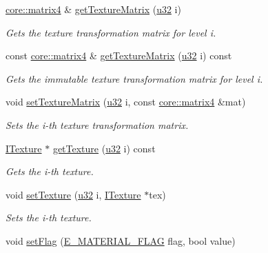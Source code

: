 \begin{DoxyCompactItemize}
\hyperlink{namespaceirr_1_1core_a4c9d4e29899535971052810954a14431}{core\+::matrix4} \& \hyperlink{classirr_1_1video_1_1SMaterial_a102aec38ea69a7c609edfad74b40463c}{get\+Texture\+Matrix} (\hyperlink{namespaceirr_a0416a53257075833e7002efd0a18e804}{u32} i)
\begin{DoxyCompactList}\small\item\em Gets the texture transformation matrix for level i. \end{DoxyCompactList}\item 
const \hyperlink{namespaceirr_1_1core_a4c9d4e29899535971052810954a14431}{core\+::matrix4} \& \hyperlink{classirr_1_1video_1_1SMaterial_a6b0adff4b14c80da0be8e8d600252fcd}{get\+Texture\+Matrix} (\hyperlink{namespaceirr_a0416a53257075833e7002efd0a18e804}{u32} i) const
\begin{DoxyCompactList}\small\item\em Gets the immutable texture transformation matrix for level i. \end{DoxyCompactList}\item 
void \hyperlink{classirr_1_1video_1_1SMaterial_a6e1a89f5005226a9cecb5272ef44ba7d}{set\+Texture\+Matrix} (\hyperlink{namespaceirr_a0416a53257075833e7002efd0a18e804}{u32} i, const \hyperlink{namespaceirr_1_1core_a4c9d4e29899535971052810954a14431}{core\+::matrix4} \&mat)
\begin{DoxyCompactList}\small\item\em Sets the i-\/th texture transformation matrix. \end{DoxyCompactList}\item 
\hyperlink{classirr_1_1video_1_1ITexture}{I\+Texture} $\ast$ \hyperlink{classirr_1_1video_1_1SMaterial_ad5883da3db8087fbbb74f7bb23e82874}{get\+Texture} (\hyperlink{namespaceirr_a0416a53257075833e7002efd0a18e804}{u32} i) const
\begin{DoxyCompactList}\small\item\em Gets the i-\/th texture. \end{DoxyCompactList}\item 
void \hyperlink{classirr_1_1video_1_1SMaterial_a44dc38e7d4a78434d12ffd02e88e3d60}{set\+Texture} (\hyperlink{namespaceirr_a0416a53257075833e7002efd0a18e804}{u32} i, \hyperlink{classirr_1_1video_1_1ITexture}{I\+Texture} $\ast$tex)
\begin{DoxyCompactList}\small\item\em Sets the i-\/th texture. \end{DoxyCompactList}\item 
void \hyperlink{classirr_1_1video_1_1SMaterial_a460db947d8e2022c6be895b77a65bbda}{set\+Flag} (\hyperlink{namespaceirr_1_1video_a8a3bc00ae8137535b9fbc5f40add70d3}{E\+\_\+\+M\+A\+T\+E\+R\+I\+A\+L\+\_\+\+F\+L\+AG} flag, bool value)

\end{DoxyCompactItemize}
